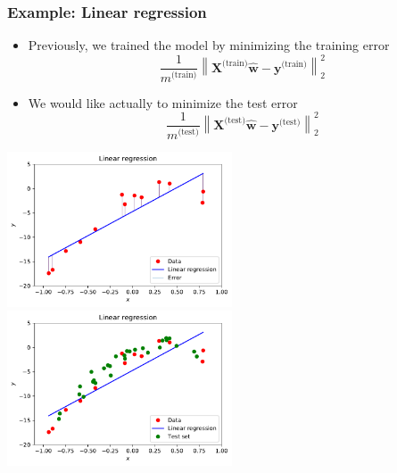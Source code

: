\documentclass[notes]{beamer}          %
\newcommand{\vect}[1]{\bm{#1}}
\newcommand{\norm}[1]{\left\lVert#1\right\rVert}
\providecommand{\norm}[1]{\lVert#1\rVert}
\newif\iffull
\begin{document}
\iffull
\begin{frame}
\frametitle{Generalization error}
    \begin{itemize}
        \item {\bf Generalization error}, also called {\bf test error} is defined as the expected error on new, previously unseen data.
        \item Unlike in simple optimization, in machine learning our main goal is to minimize the {\bf generalization error}.
        \item Usually the generalization error is estimated by measuring the performance on a {\bf test data set} which must be independent from the training set.
    \end{itemize}
\end{frame}
\fi

\begin{frame}
\frametitle{Example: Linear regression}
 \begin{itemize}
        \item Previously, we trained the model by minimizing the training error
        $$
        \frac{1}{m^{\mbox{(train)}}}\norm{\vect{X}^{\mbox{(train)}}\hat{\vect{w}} - \vect{y}^{\mbox{(train)}}}_2^2
        $$
        \item We would like actually to minimize the test error
         $$
        \frac{1}{m^{\mbox{(test)}}}\norm{\vect{X}^{\mbox{(test)}}\hat{\vect{w}} - \vect{y}^{\mbox{(test)}}}_2^2
        $$
\end{itemize}
\begin{center}
        \includegraphics[width=0.5\textwidth]{figures/week_2/linear_regression_error.pdf}
        \includegraphics[width=0.5\textwidth]{figures/week_2/linear_regression_test_set.pdf}
\end{center}
\end{frame}
\end{document}
